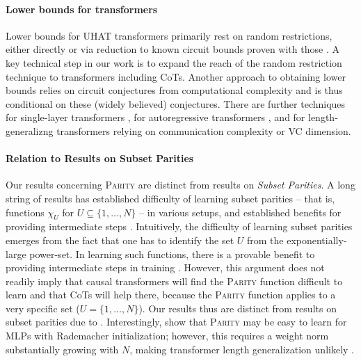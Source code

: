 \paragraph{Lower bounds for transformers}
Lower bounds for UHAT transformers primarily rest on random restrictions, either directly \citep{hahn2020theoretical, barcelo2024logical} or via reduction to known circuit bounds proven with those \citep{hao2022formal}.
A key technical step in our work is to expand the reach of the random restriction technique to transformers including CoTs.
%
Another approach to obtaining lower bounds relies on circuit conjectures from computational complexity \citep{merrill2023parallelism, sanford2024transformers} and is thus conditional on these (widely believed) conjectures.
There are further techniques for single-layer transformers \citep{kozachinskiy2024lower, peng2024limitations, sanford2023representational, Bhattamishra2024Separations, barcelo2025ehrenfeucht}, for autoregressive transformers \citep{chen2024theoretical}, and for length-generalizng transformers \citep{huang2024formal} relying on communication complexity or VC dimension. 
%

\paragraph{Relation to Results on Subset Parities}
Our results concerning \textsc{Parity} are distinct from results on \emph{Subset Parities}.
A long string of results has established difficulty of learning subset parities -- that is, functions $\chi_U$ for $U \subseteq \{1, \dots, N\}$ -- in various setups, and established benefits for providing intermediate steps \citep[e.g.][]{wies2022sub, abbe2023generalization, kim2024transformers, anonymous2024chainofthought}.
Intuitively, the difficulty of learning subset parities emerges from the fact that one has to identify the set $U$ from the exponentially-large power-set.
In learning such functions, there is a provable benefit to providing intermediate steps in training \citep{wies2022sub, abbe2023generalization, kim2024transformers, anonymous2024chainofthought}.
However, this argument does not readily imply that causal transformers will find the \textsc{Parity} function difficult to learn and that CoTs will help there, because the \textsc{Parity} function applies to a very specific set ($U = \{1, \dots, N\}$).
Our results thus are distinct from results on subset parities due to \citet{wies2022sub, abbe2023generalization, kim2024transformers, anonymous2024chainofthought}.
%
Interestingly, \citet{abbe2024learning} show that \textsc{Parity} may be easy to learn for MLPs with Rademacher initialization; however, this requires a weight norm substantially growing with $N$, making transformer length generalization unlikely \citep{huang2024formal}.

